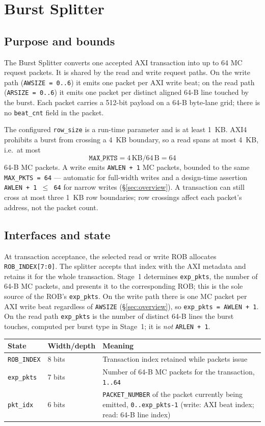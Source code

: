 \section{Burst Splitter}
\label{sec:splitter}
\subsection{Purpose and bounds}

The Burst Splitter converts one accepted AXI transaction into up to 64 MC
request packets.  It is shared by the read and write request paths.  On the
write path (\texttt{AWSIZE = 0..6}) it emits one packet per AXI write beat; on
the read path (\texttt{ARSIZE = 0..6}) it emits one packet per distinct
aligned 64-B line touched by the burst.  Each packet carries a 512-bit
payload on a 64-B byte-lane grid; there is no \texttt{beat\_cnt} field in the
packet.

The configured \texttt{row\_size} is a run-time parameter and is at least
1~KB.  AXI4 prohibits a burst from crossing a 4~KB boundary, so a read spans
at most 4~KB, i.e.\ at most
\[
 \texttt{MAX\_PKTS} = 4\,\mathrm{KB} / 64\,\mathrm{B} = 64
\]
64-B MC packets.  A write emits \texttt{AWLEN + 1} MC packets, bounded to the
same \texttt{MAX\_PKTS = 64} --- automatic for full-width writes and a
design-time assertion \texttt{AWLEN + 1 $\le$ 64} for narrow writes
(\S\ref{sec:overview}).  A transaction can still cross at most three 1~KB row
boundaries; row crossings affect each packet's address, not the packet
count.

\subsection{Interfaces and state}

At transaction acceptance, the selected read or write ROB allocates
\texttt{ROB\_INDEX[7:0]}.  The splitter accepts that index with the AXI
metadata and retains it for the whole transaction.  Stage~1 determines
\texttt{exp\_pkts}, the number of 64-B MC packets, and presents it to the
corresponding ROB; this is the sole source of the ROB's \texttt{exp\_pkts}.
On the write path there is one MC packet per AXI write beat regardless of
\texttt{AWSIZE} (\S\ref{sec:overview}), so \texttt{exp\_pkts = AWLEN + 1}.  On
the read path \texttt{exp\_pkts} is the number of distinct 64-B lines the
burst touches, computed per burst type in Stage~1; it is \emph{not}
\texttt{ARLEN + 1}.

\begin{center}
\begin{tabular}{lll}
\toprule
\textbf{State} & \textbf{Width/depth} & \textbf{Meaning}\\
\midrule
\texttt{ROB\_INDEX} & 8 bits & Transaction index retained while packets issue\\
\texttt{exp\_pkts} & 7 bits & Number of 64-B MC packets for the transaction, \texttt{1..64}\\
\texttt{pkt\_idx} & 6 bits & \texttt{PACKET\_NUMBER} of the packet currently being emitted, \texttt{0..exp\_pkts-1} (write: AXI beat index; read: 64-B line index)\\
\bottomrule
\end{tabular}
\end{center}

